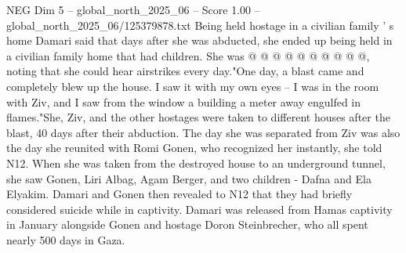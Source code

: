 \begin{textsample}{NEG Dim 5 – global\_north\_2025\_06 – Score 1.00 – global\_north\_2025\_06/125379878.txt}
Being held hostage in a civilian family ' s home Damari said that days after she was abducted, she ended up being held in a civilian family home that had children.
She was @ @ @ @ @ @ @ @ @ @, noting that she could hear airstrikes every day."One day, a blast came and completely blew up the house.
I saw it with my own eyes -- I was in the room with Ziv, and I saw from the window a building a meter away engulfed in flames."She, Ziv, and the other hostages were taken to different houses after the blast, 40 days after their abduction.
The day she was separated from Ziv was also the day she reunited with Romi Gonen, who recognized her instantly, she told N12.
When she was taken from the destroyed house to an underground tunnel, she saw Gonen, Liri Albag, Agam Berger, and two children - Dafna and Ela Elyakim.
Damari and Gonen then revealed to N12 that they had briefly considered suicide while in captivity.
Damari was released from Hamas captivity in January alongside Gonen and hostage Doron Steinbrecher, who all spent nearly 500 days in Gaza.

\end{textsample}
